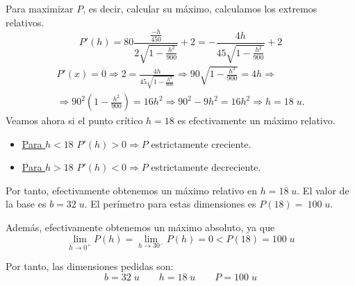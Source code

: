 \begin{ejercicio}
\begin{enumerate}
        Para maximizar $P$, es decir, calcular su máximo, calculamos los extremos relativos.
        $$P'(h) = 80\frac{\frac{-h}{450}}{2\sqrt{1 - \frac{h^2}{900}}} +2
        = -\frac{4h}{45\sqrt{1 - \frac{h^2}{900}}} +2
        $$
        \begin{multline*}
            P'(x) = 0\Longrightarrow
            2=\frac{4h}{45\sqrt{1 - \frac{h^2}{900}}} \Longrightarrow 90\sqrt{1 - \frac{h^2}{900}} = 4h
            \Longrightarrow\\ \Longrightarrow
            90^2 \left(1 - \frac{h^2}{900}\right) = 16h^2
            \Longrightarrow 90^2 - 9h^2 = 16h^2 \Longrightarrow h=18 \; u.
        \end{multline*}
        Veamos ahora si el punto crítico $h=18$ es efectivamente un máximo relativo.
        \begin{itemize}
            \item \underline{Para $h<18$} $P'(h) > 0 \Longrightarrow P$ estrictamente creciente.
            \item \underline{Para $h>18$} $P'(h) < 0 \Longrightarrow P$ estrictamente decreciente.
        \end{itemize}
        Por tanto, efectivamente obtenemos un máximo relativo en $h=18\;u.$ El valor de la base es $b=32\;u.$ El perímetro para estas dimensiones es $P(18)=~100\;u$.

        Además, efectivamente obtenemos un máximo absoluto, ya que
        $$\lim_{h\to 0^+}P(h) = \lim_{h\to 30^-}P(h) = 0 < P(18) =100\;u$$

        Por tanto, las dimensiones pedidas son:
        $$b=32\;u \qquad h=18\;u \qquad P=100\;u$$
    \end{enumerate}
\end{ejercicio}

